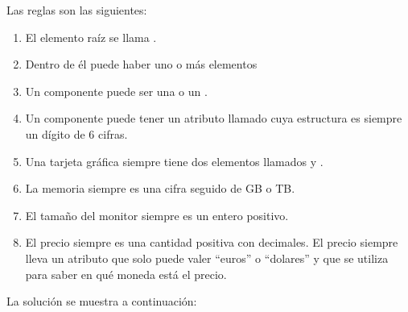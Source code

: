 \documentclass[letterpaper,10pt,spanish]{sphinxmanual}
\begin{document}
Las reglas son las siguientes:
\begin{enumerate}
\item {} 
El elemento raíz se llama .

\item {} 
Dentro de él puede haber uno o más elementos 

\item {} 
Un componente puede ser una  o un .

\item {} 
Un componente puede tener un atributo llamado  cuya estructura es siempre un dígito de 6 cifras.

\item {} 
Una tarjeta gráfica siempre tiene dos elementos llamados  y .

\item {} 
La memoria siempre es una cifra seguido de GB o TB.

\item {} 
El tamaño del monitor siempre es un entero positivo.

\item {} 
El precio siempre es una cantidad positiva con decimales. El precio siempre lleva un atributo  que solo puede valer ``euros'' o ``dolares'' y que se utiliza para saber en qué moneda está el precio.

\end{enumerate}

La solución se muestra a continuación:
\end{document}
